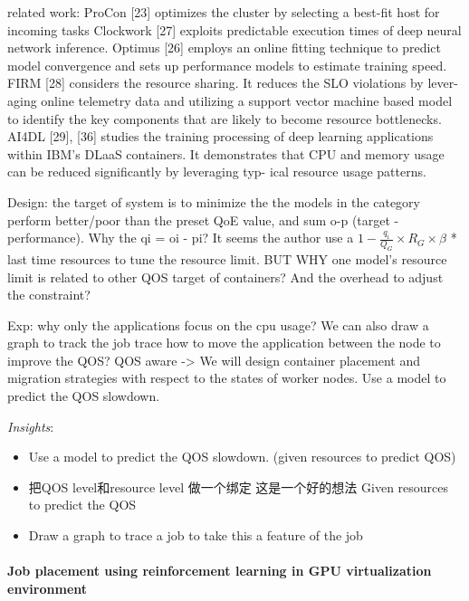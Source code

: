 \documentclass[8pt,UTF8]{article}
\begin{document}
                related work: ProCon [23] optimizes the cluster by selecting a best-fit host for incoming tasks Clockwork [27] exploits predictable execution times of deep neural network inference. Optimus [26] employs an online fitting technique to predict model convergence and sets up performance models to estimate training speed.  FIRM [28] considers the resource sharing. It reduces the SLO violations by lever- aging online telemetry data and utilizing a support vector machine based model to identify the key components that are likely to become resource bottlenecks. AI4DL [29], [36] studies the training processing of deep learning applications within IBM’s DLaaS containers. It demonstrates that CPU and memory usage can be reduced significantly by leveraging typ- ical resource usage patterns.
                
                Design: the target of system is to minimize the the models in the category perform better/poor than the preset QoE value, and sum o-p (target - performance).  Why the qi = oi - pi?  It seems the author use a $1− \frac{q_i}{Q_G}×R_G ×β$ * last time resources to tune the resource limit. BUT WHY one model's resource limit is related to other QOS target of containers? And the overhead to adjust the constraint? 
                
                Exp: why only the applications focus on the cpu usage? We can also draw a graph to track the job trace  how to move the application between the node to improve the QOS? QOS aware -> We will design container placement and migration strategies with respect to the states of worker nodes.  Use a model to predict the QOS slowdown.
            
                \emph{Insights}: 
                \begin{itemize}
                    \item Use a model to predict the QOS slowdown. (given resources to predict QOS) \\
                    \item 把QOS level和resource level 做一个绑定 这是一个好的想法 Given resources to predict the QOS
                    \item Draw a graph to trace a job to take this a feature of the job
                \end{itemize}
            \paragraph{Job placement using reinforcement learning in GPU virtualization environment}
            
\end{document}
